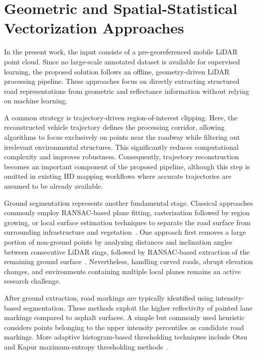 \section{Geometric and Spatial-Statistical Vectorization Approaches}
\label{sec:geometric_vectorization}

In the present work, the input consists of a pre-georeferenced mobile LiDAR point cloud. Since no large-scale annotated dataset is available for supervised learning, the proposed solution follows an offline, geometry-driven LiDAR processing pipeline. These approaches focus on directly extracting structured road representations from geometric and reflectance information without relying on machine learning.

A common strategy is trajectory-driven region-of-interest clipping. Here, the reconstructed vehicle trajectory defines the processing corridor, allowing algorithms to focus exclusively on points near the roadway while filtering out irrelevant environmental structures. This significantly reduces computational complexity and improves robustness. Consequently, trajectory reconstruction becomes an important component of the proposed pipeline, although this step is omitted in existing HD mapping workflows where accurate trajectories are assumed to be already available.

Ground segmentation represents another fundamental stage. Classical approaches commonly employ RANSAC-based plane fitting, rasterization followed by region growing, or local surface estimation techniques to separate the road surface from surrounding infrastructure and vegetation~\cite{Ground_image-basedsegmentation, Segmentationof3Dlidardatainnonflaturbanenvironments}. One approach first removes a large portion of non-ground points by analyzing distances and inclination angles between consecutive LiDAR rings, followed by RANSAC-based extraction of the remaining ground surface~\cite{interringground}. Nevertheless, handling curved roads, abrupt elevation changes, and environments containing multiple local planes remains an active research challenge.

After ground extraction, road markings are typically identified using intensity-based segmentation. These methods exploit the higher reflectivity of painted lane markings compared to asphalt surfaces. A simple but commonly used heuristic considers points belonging to the upper intensity percentiles as candidate road markings. More adaptive histogram-based thresholding techniques include Otsu and Kapur maximum-entropy thresholding methods~\cite{otsu1979threshold, GUAN201493, isprs-archives-XLII-2-W13-1089-2019,KAPUR1985273}.

